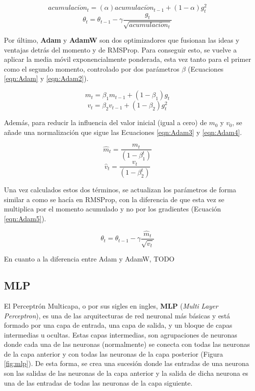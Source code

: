 \begin{equation}
\label{eqn:RMSProp}
acumulaci\acute{o}n_t = (\alpha) acumulaci\acute{o}n_{t-1} + (1-\alpha) g^{2}_{t}
\end{equation}
\begin{equation}
\label{eqn:RMSProp2}
\theta_t = \theta_{t-1} - \gamma \frac{g_t}{\sqrt{acumulaci\acute{o}n_t}}
\end{equation}

Por último, \textbf{Adam} y \textbf{AdamW} son dos optimizadores que fusionan las ideas y ventajas detrás del momento y de RMSProp. Para conseguir esto, se vuelve a aplicar la media móvil exponencialmente ponderada, esta vez tanto para el primer como el segundo momento, controlado por dos parámetros $\beta$ (Ecuaciones \ref{eqn:Adam} y \ref{eqn:Adam2}).

\begin{equation}
\label{eqn:Adam}
m_t = \beta_1 m_{t-1} + (1-\beta_1) g_{t}
\end{equation}
\begin{equation}
\label{eqn:Adam2}
v_t = \beta_2 v_{t-1} + (1-\beta_2) g^{2}_{t}
\end{equation}

Además, para reducir la influencia del valor inicial (igual a cero) de $m_0$ y $v_0$, se añade una normalización que sigue las Ecuaciones \ref{eqn:Adam3} y \ref{eqn:Adam4}.

\begin{equation}
\label{eqn:Adam3}
\hat{m}_t = \frac{m_t}{(1-\beta^{t}_{1})}
\end{equation}
\begin{equation}
\label{eqn:Adam4}
\hat{v}_t = \frac{v_t}{(1-\beta^{t}_{2})}
\end{equation}

Una vez calculados estos dos términos, se actualizan los parámetros de forma similar a como se hacía en RMSProp, con la diferencia de que esta vez se multiplica por el momento acumulado y no por los gradientes (Ecuación \ref{eqn:Adam5}).

\begin{equation}
\label{eqn:Adam5}
\theta_t = \theta_{t-1} - \gamma \frac{\hat{m}_t}{\sqrt{\hat{v}_t}}
\end{equation}

En cuanto a la diferencia entre Adam y AdamW, TODO

\subsection{MLP}
El Perceptrón Multicapa, o por sus sigles en ingles, \textbf{MLP} (\textit{Multi Layer Perceptron}), es una de las arquitecturas de red neuronal más básicas y está formado por una capa de entrada, una capa de salida, y un bloque de capas intermedias u ocultas. Estas capas intermedias, son agrupaciones de neuronas donde cada una de las neuronas (normalmente) se conecta con todas las neuronas de la capa anterior y con todas las neuronas de la capa posterior (Figura \ref{fig:mlp}). De esta forma, se crea una sucesión donde las entradas de una neurona son las salidas de las neuronas de la capa anterior y la salida de dicha neurona es una de las entradas de todas las neuronas de la capa siguiente. 

